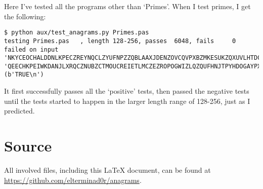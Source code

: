 \documentclass[fleqn,a4paper,11pt]{article}
\begin{document}
    Here I've tested all the programs other than `Primes'. When I test primes,
    I get the following:

\begin{lstlisting}[caption=Testing `Primes']
$ python aux/test_anagrams.py Primes.pas
testing Primes.pas   , length 128-256, passes  6048, fails     0
failed on input 'NKYCEOCHALDDNLKPECZREYNQCLZYUFNPZZQBLAAXJDENZOVCQVPXBZMKESUKZQXUVLHTDCIJVAEQFHHWVVCDPJWSIOKIKUVJIGSKPQMDMUDDWFMZYPATESQNTBUYHRZDHBWADIXBCEKSQQYZVOEIXPZLOCIOVLQHDEKEPRAHQCOAEEMYUECGGCPACBRSQXT', 'QEECHKPEIWKDANJLXRQCZNUBZCTMOUCREIETLMCZEZROPOGWIZLQZQUFHNJTPYHDOGAYPXBBNSETCULSVCSKJBAYQAFYLQXECVQKDTVXANQODDHJMSQPDAHOXEZEZCSEGVXBMYLHUPIEISZNVKQCVCKKOHVRIWYIAKDBYAUVLMDEKVWPACDDHQZFPZQDUEC' (b'TRUE\n')
\end{lstlisting}
\iffalse $ \fi %

    It first successfully passes all the `positive' tests, then passed the
    negative tests until the tests started to happen in the larger length range
    of 128-256, just as I predicted.

    \section{Source}

    All involved files, including this \LaTeX{} document, can be found at
    \url{https://github.com/elterminad0r/anagrams}.
\end{document}
